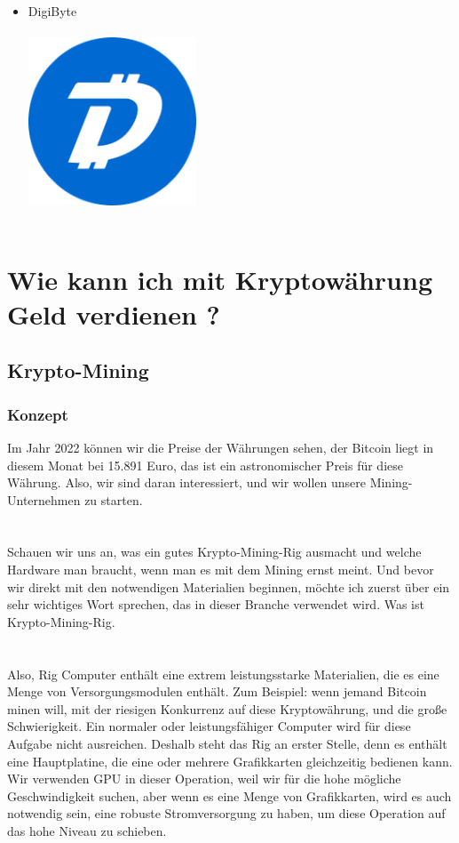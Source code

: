 \documentclass[ngerman]{scrreprt}
\begin{document}
\begin{itemize}
\begin{itemize}
		\item{DigiByte}\\ \\
		\includegraphics[width=5cm,height=5cm]{digibyte}\\ \\
	\end{itemize}
\end{itemize}


\section{Wie kann ich mit Kryptowährung Geld verdienen ?}
\subsection{Krypto-Mining}
\subsubsection{Konzept}
Im Jahr 2022 können wir die Preise der Währungen sehen, der Bitcoin liegt in diesem Monat bei 15.891 Euro, das ist ein astronomischer Preis für diese Währung. Also, wir sind daran interessiert, und wir wollen unsere Mining-Unternehmen zu starten. \\ \\ \\ 
Schauen wir uns an, was ein gutes Krypto-Mining-Rig ausmacht und welche Hardware man braucht, wenn man es mit dem Mining ernst meint. Und bevor wir direkt mit den notwendigen Materialien beginnen, möchte ich zuerst über ein sehr wichtiges Wort sprechen, das in dieser Branche verwendet wird. Was ist Krypto-Mining-Rig. \\ \\ \\ 
Also, Rig Computer enthält eine extrem leistungsstarke Materialien, die es eine Menge von Versorgungsmodulen enthält. Zum Beispiel: wenn jemand Bitcoin minen will, mit der riesigen Konkurrenz auf diese Kryptowährung, und die große Schwierigkeit. Ein normaler oder leistungsfähiger Computer wird für diese Aufgabe nicht ausreichen. Deshalb steht das Rig an erster Stelle, denn es enthält eine Hauptplatine, die eine oder mehrere Grafikkarten gleichzeitig bedienen kann. Wir verwenden GPU in dieser Operation, weil wir für die hohe mögliche Geschwindigkeit suchen, aber wenn es eine Menge von Grafikkarten, wird es auch notwendig sein, eine robuste Stromversorgung zu haben, um diese Operation auf das hohe Niveau zu schieben.
\newpage
\end{document}
